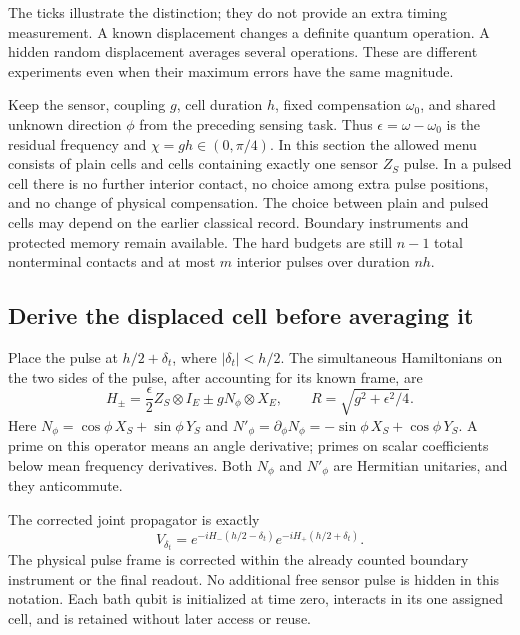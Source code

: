 \documentclass[11pt,a4paper]{article}
\numberwithin{equation}{section}
\theoremstyle{remark}
\begin{document}
The ticks illustrate the distinction; they do not provide an extra timing
measurement. A known displacement changes a definite quantum operation. A
hidden random displacement averages several operations. These are different
experiments even when their maximum errors have the same magnitude.

Keep the sensor, coupling $g$, cell duration $h$, fixed compensation
$\omega_0$, and shared unknown direction $\phi$ from the preceding sensing
task. Thus $\epsilon=\omega-\omega_0$ is the residual frequency and
$\chi=gh\in(0,\pi/4)$. In this section the allowed menu consists of plain
cells and cells containing exactly one sensor $Z_S$ pulse. In a pulsed cell
there is no further interior contact, no choice among extra pulse positions,
and no change of physical compensation. The choice between plain and pulsed
cells may depend on the earlier classical record. Boundary instruments and
protected memory remain available. The hard budgets are still $n-1$ total
nonterminal contacts and at most $m$ interior pulses over duration $nh$.

\subsection{Derive the displaced cell before averaging it}

Place the pulse at $h/2+\delta_t$, where $|\delta_t|<h/2$. The simultaneous
Hamiltonians on the two sides of the pulse, after accounting for its known
frame, are
\begin{equation}
 H_\pm=\frac{\epsilon}{2}Z_S\otimes I_E
       \pm gN_\phi\otimes X_E,
 \qquad R=\sqrt{g^2+\epsilon^2/4}.
\end{equation}
Here $N_\phi=\cos\phi\,X_S+\sin\phi\,Y_S$ and
$N'_\phi=\partial_\phi N_\phi=-\sin\phi\,X_S+\cos\phi\,Y_S$.
A prime on this operator means an angle derivative; primes on scalar
coefficients below mean frequency derivatives. Both $N_\phi$ and $N'_\phi$
are Hermitian unitaries, and they anticommute.

The corrected joint propagator is exactly
\begin{equation}
 V_{\delta_t}=e^{-iH_-(h/2-\delta_t)}e^{-iH_+(h/2+\delta_t)}.
 \label{tim:propagator}
\end{equation}
The physical pulse frame is corrected within the already counted boundary
instrument or the final readout. No additional free sensor pulse is hidden
in this notation. Each bath qubit is initialized at time zero, interacts in
its one assigned cell, and is retained without later access or reuse.
\end{document}
